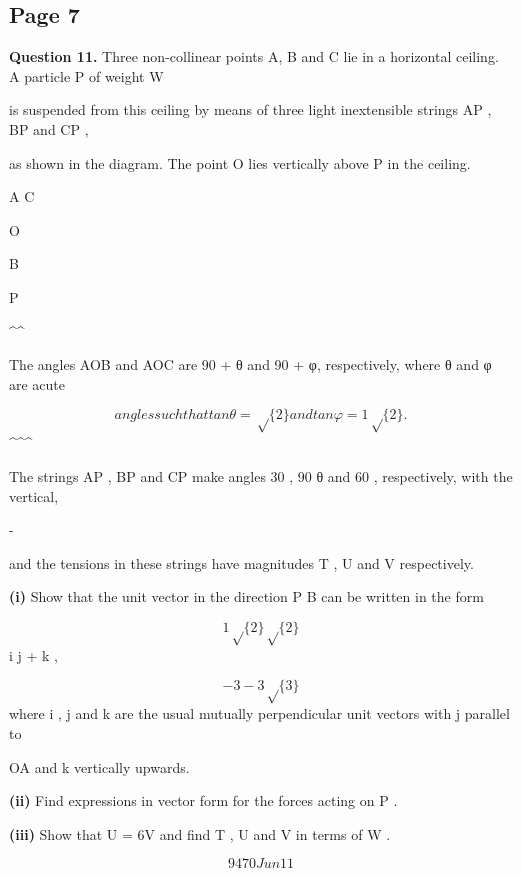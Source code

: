 \documentclass[12pt]{article}
\begin{document}
\subsection*{Page 7}
\begin{flushleft}
\bigskip\textbf{Question 11.} Three non-collinear points A, B and C lie in a horizontal ceiling. A particle P of weight W\par
is suspended from this ceiling by means of three light inextensible strings AP , BP and CP ,\par
as shown in the diagram. The point O lies vertically above P in the ceiling.\par
A C\par
O\par
B\par
P\par
\textasciicircum{}\circ \textasciicircum{}\circ\par
The angles AOB and AOC are 90 + θ and 90 + φ, respectively, where θ and φ are acute\par
\[angles such that tan θ = \sqrt\{2\} and tan φ = 1 \sqrt\{2\}.\]
\textasciicircum{}\circ \textasciicircum{}\circ \textasciicircum{}\circ\par
The strings AP , BP and CP make angles 30 , 90 θ and 60 , respectively, with the vertical,\par
-\par
and the tensions in these strings have magnitudes T , U and V respectively.\par
\textbf{(i)} Show that the unit vector in the direction P B can be written in the form\par
\[1 \sqrt\{2\} \sqrt\{2\}\]
i j + k ,\par
\[- 3 - 3 \sqrt\{3\}\]
where i , j and k are the usual mutually perpendicular unit vectors with j parallel to\par
OA and k vertically upwards.\par
\textbf{(ii)} Find expressions in vector form for the forces acting on P .\par
\textbf{(iii)} Show that U = \sqrt6V and find T , U and V in terms of W .\par
\[9470 Jun11\]
\end{flushleft}
\end{document}
